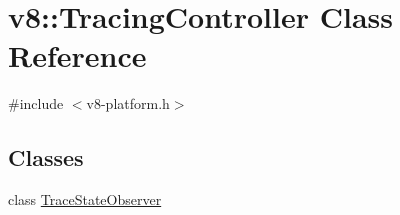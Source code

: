 \hypertarget{classv8_1_1TracingController}{}\section{v8\+:\+:Tracing\+Controller Class Reference}
\label{classv8_1_1TracingController}


{\ttfamily \#include $<$v8-\/platform.\+h$>$}

\subsection*{Classes}
\begin{DoxyCompactItemize}
\item 
class \mbox{\hyperlink{classv8_1_1TracingController_1_1TraceStateObserver}{Trace\+State\+Observer}}
\end{DoxyCompactItemize}
